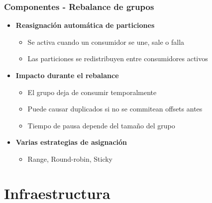 \documentclass[aspectratio=169]{beamer}
\begin{document}
\begin{frame}\frametitle{Componentes - Rebalance de grupos}
\begin{itemize}
  \item \textbf{Reasignación automática de particiones}
  \begin{itemize}
    \item Se activa cuando un consumidor se une, sale o falla
    \item Las particiones se redistribuyen entre consumidores activos
  \end{itemize}

  \vspace{1em}

  \item \textbf{Impacto durante el rebalance}
  \begin{itemize}
    \item El grupo deja de consumir temporalmente
    \item Puede causar duplicados si no se commitean offsets antes
    \item Tiempo de pausa depende del tamaño del grupo
  \end{itemize}

  \vspace{1em}

  \item \textbf{Varias estrategias de asignación}
  \begin{itemize}
    \item Range, Round-robin, Sticky
  \end{itemize}
\end{itemize}
\end{frame}


\section{Infraestructura}
\end{document}
